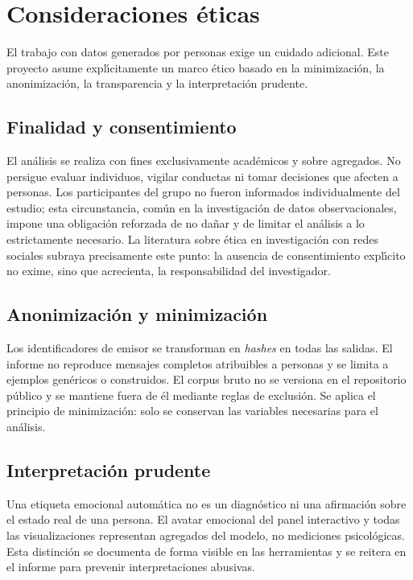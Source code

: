 \section{Consideraciones éticas}
\label{sec:etica}

El trabajo con datos generados por personas exige un cuidado adicional. Este proyecto
asume expl\'\i{}citamente un marco \'etico basado en la minimizaci\'on, la anonimizaci\'on,
la transparencia y la interpretaci\'on prudente.

\subsection{Finalidad y consentimiento}

El an\'alisis se realiza con fines exclusivamente acad\'emicos y sobre agregados. No
persigue evaluar individuos, vigilar conductas ni tomar decisiones que afecten a
personas. Los participantes del grupo no fueron informados individualmente del estudio;
esta circunstancia, com\'un en la investigaci\'on de datos observacionales, impone una
obligaci\'on reforzada de no da\~nar y de limitar el an\'alisis a lo estrictamente
necesario. La literatura sobre \'etica en investigaci\'on con redes sociales
\citep{townsend2016social,freelon2019computational} subraya precisamente este punto:
la ausencia de consentimiento expl\'\i{}cito no exime, sino que acrecienta, la
responsabilidad del investigador.

\subsection{Anonimización y minimizaci\'on}

Los identificadores de emisor se transforman en \emph{hashes} en todas las salidas. El
informe no reproduce mensajes completos atribuibles a personas y se limita a ejemplos
genéricos o construidos. El corpus bruto no se versiona en el repositorio p\'ublico y se
mantiene fuera de \'el mediante reglas de exclusi\'on. Se aplica el principio de
minimizaci\'on: solo se conservan las variables necesarias para el an\'alisis.

\subsection{Interpretaci\'on prudente}

Una etiqueta emocional autom\'atica no es un diagn\'ostico ni una afirmaci\'on sobre el
estado real de una persona. El avatar emocional del panel interactivo y todas las
visualizaciones representan agregados del modelo, no mediciones psicol\'ogicas. Esta
distinci\'on se documenta de forma visible en las herramientas y se reitera en el
informe para prevenir interpretaciones abusivas.

